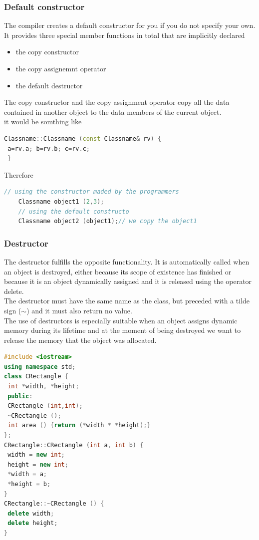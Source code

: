 \documentclass[12pt,oneside]{book}
\begin{document}
\subsubsection{Default constructor}
The compiler creates a default constructor for you if you do not specify your own. It provides three special member functions in total that are implicitly declared
\begin{itemize}
	\item the copy constructor
	\item the copy assignemnt operator
	\item the default destructor
\end{itemize}
The copy constructor and the copy assignment operator copy all the data contained in another object to the data members of the current object.\\
it would be somthing like
	\begin{lstlisting}[language=C++]
Classname::Classname (const Classname& rv) {
 a=rv.a; b=rv.b; c=rv.c; 
 }
\end{lstlisting}
Therefore
	\begin{lstlisting}[language=C++]
    // using the constructor maded by the programmers
    Classname object1 (2,3); 
    // using the default constructo
    Classname object2 (object1);// we copy the object1
\end{lstlisting}
\subsubsection{Destructor}
The destructor fulfills the opposite functionality. It is automatically called when an object is destroyed, either because its scope of existence has finished or because it is an object dynamically assigned and it is released using the operator delete.\\
The destructor must have the same name as the class, but preceded with a tilde sign ($\sim$) and it must also return no value.\\

The use of destructors is especially suitable when an object assigns dynamic memory during its lifetime and at the moment of being destroyed we want to release the memory that the object was allocated.
	\begin{lstlisting}[language=C++]
#include <iostream>
using namespace std; 
class CRectangle { 
 int *width, *height; 
 public: 
 CRectangle (int,int); 
 ~CRectangle (); 
 int area () {return (*width * *height);} 
}; 
CRectangle::CRectangle (int a, int b) { 
 width = new int; 
 height = new int; 
 *width = a; 
 *height = b; 
} 
CRectangle::~CRectangle () { 
 delete width; 
 delete height; 
} 
\end{lstlisting}
\end{document}
